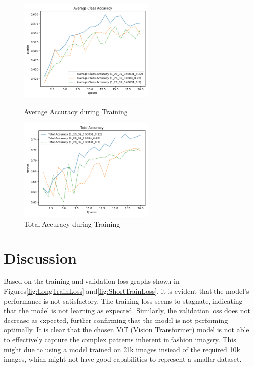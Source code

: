 \documentclass{article}
\begin{document}
\begin{figure}[H]
    \centering
    \begin{minipage}[b]{0.45\textwidth}
        \centering
        \includegraphics[width=\textwidth, height=5cm]{imgs/Average_accuracy.png}
        \caption{Average Accuracy during Training}
        \label{fig:AverageAccuracy}
    \end{minipage}
    \hfill
    \begin{minipage}[b]{0.45\textwidth}
        \centering
        \includegraphics[width=\textwidth, height=5cm]{imgs/Total_accuracy.png}
        \caption{Total Accuracy during Training}
        \label{fig:TotalAccuracy}
    \end{minipage}
\end{figure}


\section{Discussion}

Based on the training and validation loss graphs shown in Figures\ref{fig:LongTrainLoss} and\ref{fig:ShortTrainLoss}, it is evident that the model's performance is not satisfactory. The training loss seems to stagnate, indicating that the model is not learning as expected. Similarly, the validation loss does not decrease as expected, further confirming that the model is not performing optimally. It is clear that the chosen ViT (Vision Transformer) model is not able to effectively capture the complex patterns inherent in fashion imagery. This might due to using a model trained on 21k images instead of the required 10k images, which might not have good capabilities to represent a smaller dataset. 
\end{document}
